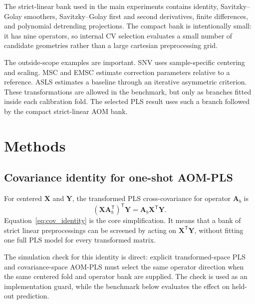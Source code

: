 \documentclass[11pt,a4paper]{article}
\newcommand{\X}{\mathbf{X}}
\newcommand{\Y}{\mathbf{Y}}
\newcommand{\A}{\mathbf{A}}
\newcommand{\transpose}{^{\mathsf T}}
\begin{document}
The strict-linear bank used in the main experiments contains identity,
Savitzky--Golay smoothers, Savitzky--Golay first and second derivatives,
finite differences, and polynomial detrending projections.  The compact bank
is intentionally small: it has nine operators, so internal CV selection
evaluates a small number of candidate geometries rather than a large
cartesian preprocessing grid.

\begin{table}[t]
  \centering
  \caption{Operator-bank scope.  Strict linear operators are handled by the
  AOM identities; fitted or sample-adaptive transformations remain explicit
  fold-local branches.}
  \label{tab:operators}
  \small
  
\end{table}

The outside-scope examples are important.  SNV uses sample-specific centering
and scaling.  MSC and EMSC estimate correction parameters relative to a
reference.  ASLS estimates a baseline through an iterative asymmetric
criterion.  These transformations are allowed in the benchmark, but only as
branches fitted inside each calibration fold.  The selected PLS result uses
such a branch followed by the compact strict-linear AOM bank.

\section{Methods}

\subsection{Covariance identity for one-shot AOM-PLS}

For centered $\X$ and $\Y$, the transformed PLS cross-covariance for operator
$\A_b$ is
\begin{equation}
  (\X\A_b\transpose)\transpose\Y
  =
  \A_b\X\transpose\Y .
  \label{eq:cov_identity}
\end{equation}
Equation~\ref{eq:cov_identity} is the core simplification.  It means that a
bank of strict linear preprocessings can be screened by acting on
$\X\transpose\Y$, without fitting one full PLS model for every transformed
matrix.

The simulation check for this identity is direct: explicit transformed-space
PLS and covariance-space AOM-PLS must select the same operator direction when
the same centered fold and operator bank are supplied.  The check is used as
an implementation guard, while the benchmark below evaluates the effect on
held-out prediction.
\end{document}

